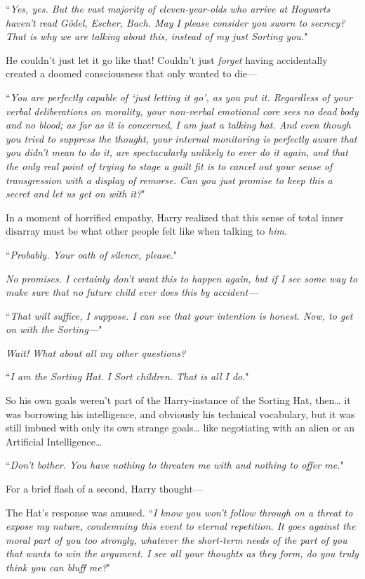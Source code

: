 ``\emph{Yes, yes. But the vast majority of eleven-year-olds who arrive at Hogwarts haven't read \emph{Gödel, Escher, Bach}. May I please consider you sworn to secrecy? That is \emph{why} we are talking about this, instead of my just Sorting you.}"

He couldn't just let it go like that! Couldn't just \emph{forget} having accidentally created a doomed consciousness that only wanted to die—

``\emph{You are perfectly capable of `just letting it go', as you put it. Regardless of your verbal deliberations on morality, your non-verbal emotional core sees no dead body and no blood; as far as it is concerned, I am just a talking hat. And even though you tried to suppress the thought, your internal monitoring is perfectly aware that you didn't mean to do it, are spectacularly unlikely to ever do it again, and that the only real point of trying to stage a guilt fit is to cancel out your sense of transgression with a display of remorse. Can you just promise to keep this a secret and let us get on with it?}"

In a moment of horrified empathy, Harry realized that this sense of total inner disarray must be what other people felt like when talking to \emph{him}.

``\emph{Probably. Your oath of silence, please.}"

\emph{No promises. I certainly don't want this to happen again, but if I see some way to make \emph{sure} that no future child ever does this by accident—}

``\emph{That will suffice, I suppose. I can see that your intention is honest. Now, to get on with the Sorting—}"

\emph{Wait! What about all my other questions?}

``\emph{I am the Sorting Hat. I Sort children. That is all I do.}"

So his own goals weren't part of the Harry-instance of the Sorting Hat, then{\ldots} it was borrowing his intelligence, and obviously his technical vocabulary, but it was still imbued with only its own strange goals{\ldots} like negotiating with an alien or an Artificial Intelligence{\ldots}

``\emph{Don't bother. You have nothing to threaten me with and nothing to offer me.}"

For a brief flash of a second, Harry thought—

The Hat's response was amused. ``\emph{I know you won't follow through on a threat to expose my nature, condemning this event to eternal repetition. It goes against the moral part of you too strongly, whatever the short-term needs of the part of you that wants to win the argument. I see all your thoughts as they form, do you truly think you can bluff me?}"

